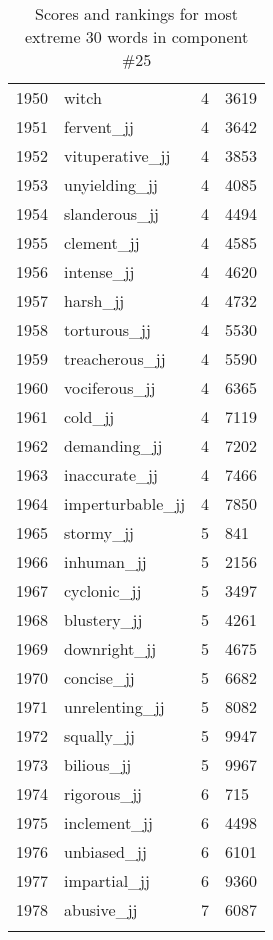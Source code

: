 \begin{longtable}[!htbp]{| rlr@{.}l |}
    1950 & witch & 4 & 3619 \\
    1951 & fervent\_jj & 4 & 3642 \\
    1952 & vituperative\_jj & 4 & 3853 \\
    1953 & unyielding\_jj & 4 & 4085 \\
    1954 & slanderous\_jj & 4 & 4494 \\
    1955 & clement\_jj & 4 & 4585 \\
    1956 & intense\_jj & 4 & 4620 \\
    1957 & harsh\_jj & 4 & 4732 \\
    1958 & torturous\_jj & 4 & 5530 \\
    1959 & treacherous\_jj & 4 & 5590 \\
    1960 & vociferous\_jj & 4 & 6365 \\
    1961 & cold\_jj & 4 & 7119 \\
    1962 & demanding\_jj & 4 & 7202 \\
    1963 & inaccurate\_jj & 4 & 7466 \\
    1964 & imperturbable\_jj & 4 & 7850 \\
    1965 & stormy\_jj & 5 & 841 \\
    1966 & inhuman\_jj & 5 & 2156 \\
    1967 & cyclonic\_jj & 5 & 3497 \\
    1968 & blustery\_jj & 5 & 4261 \\
    1969 & downright\_jj & 5 & 4675 \\
    1970 & concise\_jj & 5 & 6682 \\
    1971 & unrelenting\_jj & 5 & 8082 \\
    1972 & squally\_jj & 5 & 9947 \\
    1973 & bilious\_jj & 5 & 9967 \\
    1974 & rigorous\_jj & 6 & 715 \\
    1975 & inclement\_jj & 6 & 4498 \\
    1976 & unbiased\_jj & 6 & 6101 \\
    1977 & impartial\_jj & 6 & 9360 \\
    1978 & abusive\_jj & 7 & 6087 \\
    \hline
    \caption{Scores and rankings for most extreme 30 words in component \#25} \\
\end{longtable}
